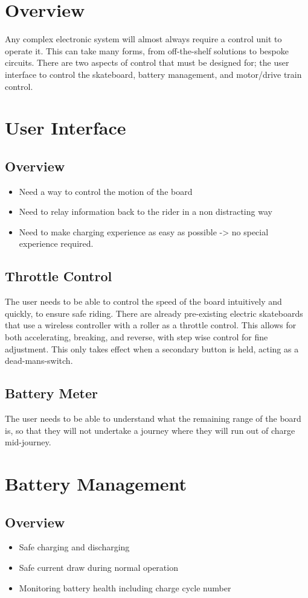 \documentclass[journal,10pt]{IEEEtran}
\begin{document}
\section{Overview}
	Any complex electronic system will almost always require a control unit to operate it. This can take many forms, from off-the-shelf solutions to bespoke circuits.
	There are two aspects of control that must be designed for; the user interface to control the skateboard, battery management, and motor/drive train control.
\section{User Interface}
	\subsection{Overview}
		\begin{itemize}
			\item Need a way to control the motion of the board
			\item Need to relay information back to the rider in a non distracting way
			\item Need to make charging experience as easy as possible -> no special experience required.
		\end{itemize}
	\subsection{Throttle Control}
		The user needs to be able to control the speed of the board intuitively and quickly, to ensure safe riding.
		There are already pre-existing electric skateboards that use a wireless controller with a roller as a throttle control. 
		This allows for both accelerating, breaking, and reverse, with step wise control for fine adjustment.
		This only takes effect when a secondary button is held, acting as a dead-mans-switch.
	\subsection{Battery Meter}
		The user needs to be able to understand what the remaining range of the board is, so that they will not undertake a journey where they will run out of charge mid-journey.
\section{Battery Management}
	\subsection{Overview}
		\begin{itemize}
			\item Safe charging and discharging 
			\item Safe current draw during normal operation
			\item Monitoring battery health including charge cycle number
		\end{itemize}
\end{document}
